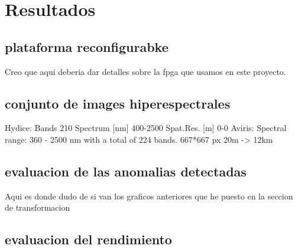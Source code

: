 \cleardoublepage
\chapter{Resultados}
\label{makereference}
\section{plataforma reconfigurabke}
Creo que aqui deberia dar detalles sobre la fpga que usamos en este proyecto.
\section{conjunto de images hiperespectrales}

Hydice: Bands 	210
Spectrum [nm] 	400-2500
Spat.Res. [m] 	0-0 
Aviris:
Spectral range: 360 - 2500 nm with a total of 224 bands. 
667*667 px
20m -> 12km
\section{evaluacion de las anomalias detectadas}
Aqui es donde dudo de si van los graficos anteriores que he puesto en la seccion de transformacion
\section{evaluacion del rendimiento}